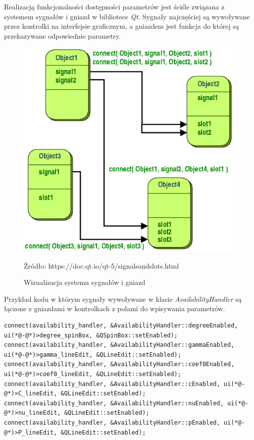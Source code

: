 \documentclass[paper=a4, fontsize=11pt]{scrartcl} %
\numberwithin{equation}{section} %
\numberwithin{figure}{section} %
\newcommand*{\captionsource}[2]{%
  \caption[{#1}]{%
      #1}
    Źródło: #2%
}
\begin{document}
    \par Realizacją funkcjonalności dostępności parametrów jest ściśle związana z systemem
    sygnałów i gniazd w bibliotece \textit{Qt}. Sygnały najczęściej są wywoływane przez
    kontrolki na interfejsie graficznym, a gniazdem jest funkcja do której są
    przekazywane odpowiednie parametry.

    \begin{figure}[h]
        \begin{center}
            \includegraphics[scale=0.6]{./img/signal_slots.png}
            \captionsource{Wizualizacja systemu sygnałów i
            gniazd}{https://doc.qt.io/qt-5/signalsandslots.html}
            \label{fig:signal_slots}
        \end{center}
    \end{figure}

\newpage 

    \par Przykład kodu w którym sygnały wywoływane w klasie \textit{AvailabilityHandler} są łączone
    z gniazdami w kontrolkach z polami do wpisywania parametrów.

    \begin{lstlisting}
connect(availability_handler, &AvailabilityHandler::degreeEnabled, ui(*@-@*)>degree_spinBox, &QSpinBox::setEnabled);
connect(availability_handler, &AvailabilityHandler::gammaEnabled, ui(*@-@*)>gamma_lineEdit, &QLineEdit::setEnabled);
connect(availability_handler, &AvailabilityHandler::coef0Enabled, ui(*@-@*)>coef0_lineEdit, &QLineEdit::setEnabled);
connect(availability_handler, &AvailabilityHandler::cEnabled, ui(*@-@*)>C_lineEdit, &QLineEdit::setEnabled);
connect(availability_handler, &AvailabilityHandler::nuEnabled, ui(*@-@*)>nu_lineEdit, &QLineEdit::setEnabled);
connect(availability_handler, &AvailabilityHandler::pEnabled, ui(*@-@*)>P_lineEdit, &QLineEdit::setEnabled);
    \end{lstlisting}
\end{document}
